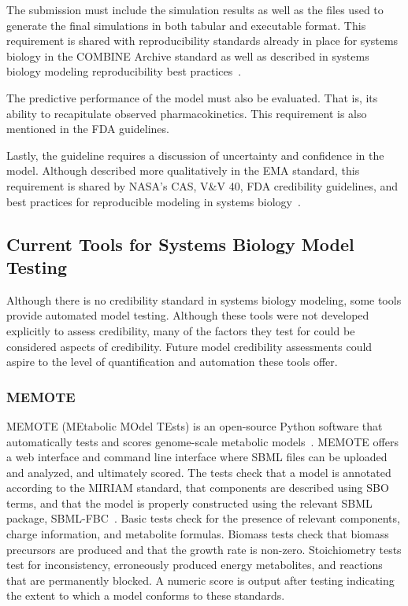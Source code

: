\documentclass[12pt]{report}
\begin{document}
The submission must include the simulation results as well as the files used to generate the final simulations in both tabular and executable format. This requirement is shared with reproducibility standards already in place for systems biology in the COMBINE Archive standard as well as described in systems biology modeling reproducibility best practices~\cite{porubsky_best_2020}.

The predictive performance of the model must also be evaluated. That is, its ability to recapitulate observed pharmacokinetics. This requirement is also mentioned in the FDA guidelines. 

Lastly, the guideline requires a discussion of uncertainty and confidence in the model. Although described more qualitatively in the EMA standard, this requirement is shared by NASA's CAS, V\&V 40, FDA credibility guidelines, and best practices for reproducible modeling in systems biology~\cite{porubsky_best_2020}.




\subsection{Current Tools for Systems Biology Model Testing}
Although there is no credibility standard in systems biology modeling, some tools provide automated model testing. Although these tools were not developed explicitly to assess credibility, many of the factors they test for could be considered aspects of credibility. Future model credibility assessments could aspire to the level of quantification and automation these tools offer. 
 
\subsubsection{MEMOTE}
MEMOTE (MEtabolic MOdel TEsts) is an open-source Python software that automatically tests and scores genome-scale metabolic models~\cite{Lieven2020-kj}. MEMOTE offers a web interface and command line interface where SBML files can be uploaded and analyzed, and ultimately scored. The tests check that a model is annotated according to the MIRIAM standard, that components are described using SBO terms, and that the model is properly constructed using the relevant SBML package, SBML-FBC~\cite{Lieven2020-kj, Olivier2018-tx}. Basic tests check for the presence of relevant components, charge information, and metabolite formulas. Biomass tests check that biomass precursors are produced and that the growth rate is non-zero. Stoichiometry tests test for inconsistency, erroneously produced energy metabolites, and reactions that are permanently blocked. A numeric score is output after testing indicating the extent to which a model conforms to these standards.
\end{document}
